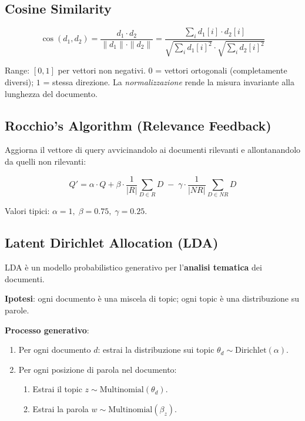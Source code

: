 \documentclass[12pt,a4paper]{article}
\begin{document}
\subsection{Cosine Similarity}

\begin{formulabox}
\[
\cos(d_1, d_2) = \frac{d_1 \cdot d_2}{\|d_1\| \cdot \|d_2\|} = \frac{\sum_i d_1[i]\cdot d_2[i]}{\sqrt{\sum_i d_1[i]^2}\cdot\sqrt{\sum_i d_2[i]^2}}
\]
\end{formulabox}

Range: $[0, 1]$ per vettori non negativi. $0$ = vettori ortogonali (completamente diversi); $1$ = stessa direzione. La \emph{normalizzazione} rende la misura invariante alla lunghezza del documento.

\subsection{Rocchio's Algorithm (Relevance Feedback)}

Aggiorna il vettore di query avvicinandolo ai documenti rilevanti e allontanandolo da quelli non rilevanti:

\begin{formulabox}
\[
Q' = \alpha \cdot Q + \beta \cdot \frac{1}{|R|}\sum_{D \in R} D \;-\; \gamma \cdot \frac{1}{|NR|}\sum_{D \in NR} D
\]
\end{formulabox}

Valori tipici: $\alpha=1,\; \beta=0.75,\; \gamma=0.25$.

\subsection{Latent Dirichlet Allocation (LDA)}

LDA è un modello probabilistico generativo per l'\textbf{analisi tematica} dei documenti.

\begin{defbox}
\textbf{Ipotesi}: ogni documento è una miscela di topic; ogni topic è una distribuzione su parole.
\end{defbox}

\textbf{Processo generativo}:
\begin{enumerate}[leftmargin=1.5em, label=\arabic*.]
  \item Per ogni documento $d$: estrai la distribuzione sui topic $\theta_d \sim \text{Dirichlet}(\alpha)$.
  \item Per ogni posizione di parola nel documento:
    \begin{enumerate}[label=\alph*.]
      \item Estrai il topic $z \sim \text{Multinomial}(\theta_d)$.
      \item Estrai la parola $w \sim \text{Multinomial}(\beta_z)$.
    \end{enumerate}
\end{enumerate}
\end{document}
